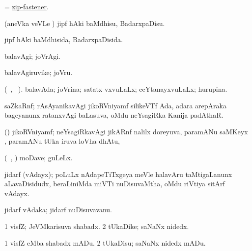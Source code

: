 \bentry
{} 
\gl{\nA} 
\bmng
= \hyperlink{zip-fastener}{zip-fastener}.
\emng
\eentry

\bentry
{} 
\gl{\sakirx} 
\bmng
(aneVka veVLe ) jipf hAki baMdhisu, BadarxpaDisu.
\emng
\eentry

\bentry
{} 
\gl{\gu} 
\bmng
jipf hAki baMdhisida, BadarxpaDisida.
\emng
\eentry

\bentry
{} 
\gl{\kirxvi} 
\bmng
balavAgi; joVrAgi.
\emng
\eentry

\bentry
{} 
\gl{\nA} 
\bmng
balavAgiruvike; joVru.
\emng
\eentry

\bentry
{} 
\gl{\gu} 
\bmng
(\tara\ , \tama\ ).
balavAda; joVrina; satatx  vxvuLaLx; ceYtanayxvuLaLx; hurupina.
\emng
\eentry

\bentry
{} 
\gl{\nA} 
\bmng
saZkaRnf; rAsAyanikavAgi jikoRVniyamf silikeVTf Ada, adara arepAraka bageyanunx ratanxvAgi baLasuva, oMdu neYsagiRka Kanija padAthaR.
\emng
\eentry

\bentry
{} 
\gl{\nA}  
\bmng
(\ravi) jikoRVniyamf; neYsagiRkavAgi jikARnf   nalilx doreyuva, paramANu saMKeyx , paramANu tUka  iruva loVha dhAtu, \saMkeV\ 
\emng
\eentry

\bentry
{} 
\gl{\nA}
\bmng
(\kanmu\ \ame, \ashi) moDave; guLeLx.
\emng
\eentry

\bentry
{} 
\gl{\nA}
\bmng
jidarf (vAdayx); poLuLx nAdapeTiTxgeya meVle halavAru taMtigaLanunx aLavaDisidudx, beraLiniMda miVTi nuDisuvaMtha, oMdu riVtiya sitArf vAdayx. 
\emng
\eentry

\bentry
{} 
\gl{\nA} 
\bmng
jidarf vAdaka; jidarf nuDisuvavanu. 
\emng
\eentry

\bentry
{} 
\gl{\nA} 
\bmng
\bnum
\num{1} visfZ; JeVMkarisuva shabadx. 
\num{2} tUkaDike; saNaNx nidedx.
\enum
\emng 
\eentry

\bentry
{} 
\gl{\akirx} 
\bmng
\bnum
\num{1} visfZ eMba shabadx mADu. 
\num{2} tUkaDisu; saNaNx nidedx mADu.
\enum
\emng
\eentry

